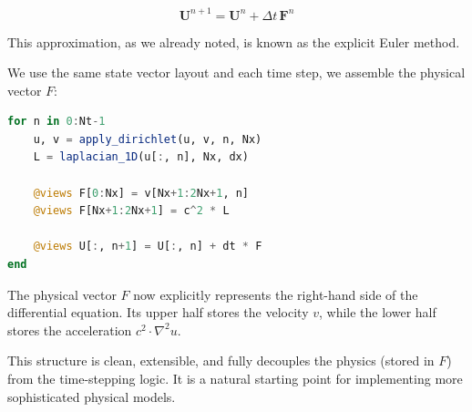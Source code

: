 \[
\mathbf{U}^{n+1} = \mathbf{U}^n + \Delta t\, \mathbf{F}^n
\]

This approximation, as we already noted, is known as the explicit Euler method.

We use the same state vector layout and each time step, we assemble the physical vector $F$:

\begin{lstlisting}[language=Julia]
for n in 0:Nt-1
    u, v = apply_dirichlet(u, v, n, Nx)
    L = laplacian_1D(u[:, n], Nx, dx)

    @views F[0:Nx] = v[Nx+1:2Nx+1, n]
    @views F[Nx+1:2Nx+1] = c^2 * L

    @views U[:, n+1] = U[:, n] + dt * F
end
\end{lstlisting}

The physical vector $F$ now explicitly represents the right-hand side of the differential equation. Its upper half stores the velocity $v$, while the lower half stores the acceleration $c^2 \cdot \nabla^2 u$.

This structure is clean, extensible, and fully decouples the physics (stored in $F$) from the time-stepping logic. It is a natural starting point for implementing more sophisticated physical models.